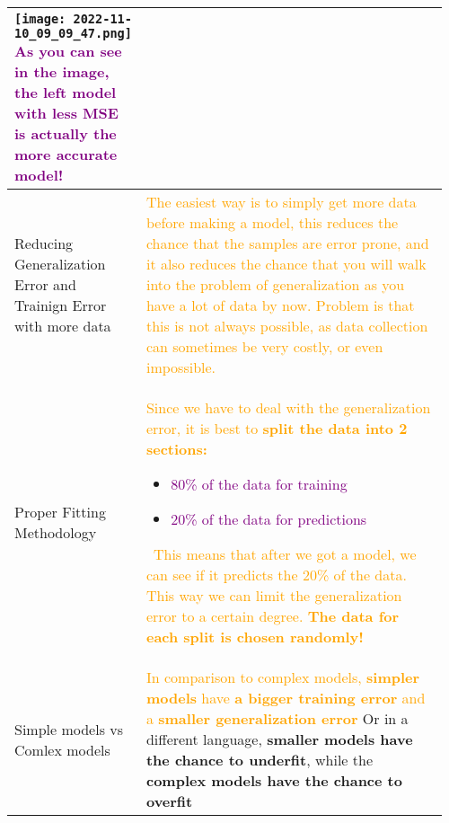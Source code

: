 \documentclass[main.tex,fontsize=8pt,paper=a4,paper=portrait,DIV=calc,]{scrartcl}
\begin{document}
\begin{table}[ht!]
\begin{tabular}{|m{0.2\linewidth}|m{0.755\linewidth}|}
\texttt{[image: 2022-11-10\_09\_09\_47.png]}\newline
\textcolor{purple}{As you can see in the image, the left model with less MSE is actually the more accurate model!}\\
\hline
Reducing Generalization Error and Trainign Error with more data & 
\textcolor{orange}{The easiest way is to simply get more data before making a model, this reduces the chance that the samples are error prone, and it also reduces the chance that you will walk into the problem of generalization as you have a lot of data by now.\newline
Problem is that this is not always possible, as data collection can sometimes be very costly, or even impossible.}\\
\hline
Proper Fitting Methodology & 
\textcolor{orange}{Since we have to deal with the generalization error, it is best to \textbf{split the data into 2 sections:}}\newline
\begin{itemize}
\item \textcolor{purple}{80\% of the data for training}
\item \textcolor{purple}{20\% of the data for predictions}
\end{itemize} 
\, \newline
\textcolor{orange}{This means that after we got a model, we can see if it predicts the 20\% of the data. \newline
This way we can limit the generalization error to a certain degree.\newline
\textbf{The data for each split is chosen randomly!}}\\
\hline
Simple models vs Comlex models &
\textcolor{orange}{In comparison to complex models, \textbf{simpler models} have \textbf{a bigger training error} and a \textbf{smaller generalization error}}\newline
Or in a different language, \textbf{smaller models have the chance to underfit}, while the \textbf{complex models have the chance to overfit}\\
\hline
\end{tabular}
\end{table}
\pagebreak
\end{document}
